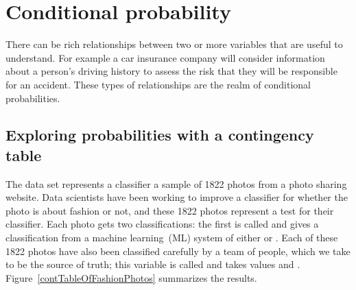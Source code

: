 {}




\section{Conditional probability}
\label{conditionalProbabilitySection}

There can be rich relationships between two or more
variables that are useful to understand.
For example a car insurance company will consider
information about a person's driving history to assess
the risk that they will be responsible for an accident.
These types of relationships are the realm of conditional
probabilities.


\subsection{Exploring probabilities with a contingency table}


\newcommand{\fashN}{1822}
\newcommand{\fashYY}{197}
\newcommand{\fashYN}{22}
\newcommand{\fashYA}{219}
\newcommand{\fashNY}{112}
\newcommand{\fashNN}{1491}
\newcommand{\fashNA}{1603}
\newcommand{\fashAY}{309}
\newcommand{\fashAN}{1513}
\newcommand{\fashAA}{\fashN{}}
\newcommand{\fashCYPY}{0.96}
\newcommand{\fashCYPN}{0.04}
\newcommand{\fashCNPY}{0.07}
\newcommand{\fashCNPN}{0.93}

The  data set represents
a classifier a sample of \fashN{} photos from a photo sharing website.
Data scientists have been working to improve a classifier for
whether the photo is about fashion or not, and these 1822 photos
represent a test for their classifier.
Each photo gets two classifications:
the first is called  and gives
a classification from a machine
learning~(ML) system of
either  or .
Each of these \fashN{} photos have also been classified carefully
by a team of people, which we take to be the source of truth;
this variable is called  and takes values
 and .
Figure~\ref{contTableOfFashionPhotos} summarizes the results.

